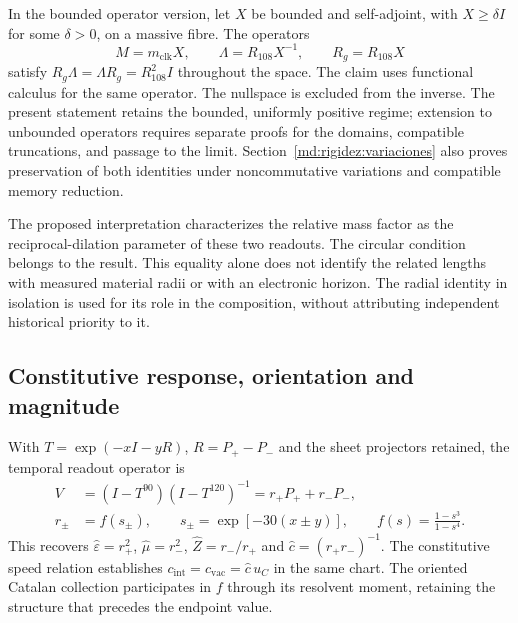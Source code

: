 In the bounded operator version, let $X$ be bounded and self-adjoint, with
$X\geq\delta I$ for some $\delta>0$, on a massive fibre. The operators
\begin{equation}
 M=m_{\mathrm{clk}}X,\qquad
 \Lambda=R_{108}X^{-1},\qquad R_g=R_{108}X
 \label{md:hib:operadores-radiales}
\end{equation}
satisfy $R_g\Lambda=\Lambda R_g=R_{108}^2I$ throughout the space.
The claim uses functional calculus for the same operator. The nullspace
is excluded from the inverse. The present statement retains the bounded,
uniformly positive regime; extension to unbounded operators requires
separate proofs for the domains, compatible truncations, and passage
to the limit. Section~\ref{md:rigidez:variaciones} also proves preservation
of both identities under noncommutative variations and compatible
memory reduction.

The proposed interpretation characterizes the relative mass factor as
the reciprocal-dilation parameter of these two readouts. The circular
condition belongs to the result. This equality alone does not identify
the related lengths with measured material radii or with an electronic
horizon. The radial identity in isolation is used for its role in the
composition, without attributing independent historical priority to it.

\subsection{Constitutive response, orientation and magnitude}
\label{md:hib:constitutivas}

With $T=\exp(-xI-yR)$, $R=P_+-P_-$ and the sheet projectors retained,
the temporal readout operator is
\begin{equation}
 \begin{aligned}
 V&=(I-T^{90})(I-T^{120})^{-1}=r_+P_++r_-P_-,\\
 r_\pm&=f(s_\pm),\qquad
 s_\pm=\exp[-30(x\pm y)],\qquad
 f(s)=\frac{1-s^3}{1-s^4}.
 \end{aligned}
 \label{md:hib:operador-constitutivo}
\end{equation}
This recovers $\widehat\varepsilon=r_+^2$, $\widehat\mu=r_-^2$,
$\widehat Z=r_-/r_+$ and $\widehat c=(r_+r_-)^{-1}$.
The constitutive speed relation establishes
$c_{\mathrm{int}}=c_{\mathrm{vac}}=\widehat c\,u_C$ in the same chart.
The oriented Catalan collection participates in $f$ through its resolvent
moment, retaining the structure that precedes the endpoint value.


